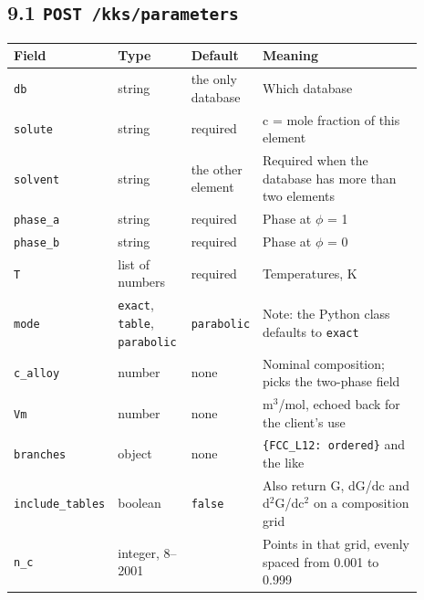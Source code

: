 \documentclass[12pt,a4paper]{article}
\begin{document}
\subsection*{9.1 \texttt{POST /\allowbreak{}kks/\allowbreak{}parameters}}
\begingroup\small
\begin{longtable}{>{\raggedright\arraybackslash}p{0.121\linewidth}>{\raggedright\arraybackslash}p{0.183\linewidth}>{\raggedright\arraybackslash}p{0.161\linewidth}>{\raggedright\arraybackslash}p{0.428\linewidth}}
\toprule
\textbf{Field} & \textbf{Type} & \textbf{Default} & \textbf{Meaning} \\
\midrule
\endhead
\texttt{db} & string & the only database & Which database \\
\texttt{solute} & string & required & c = mole fraction of this element \\
\texttt{solvent} & string & the other element & Required when the database has more than two elements \\
\texttt{phase\_\allowbreak{}a} & string & required & Phase at \(\phi\) = 1 \\
\texttt{phase\_\allowbreak{}b} & string & required & Phase at \(\phi\) = 0 \\
\texttt{T} & list of numbers & required & Temperatures, K \\
\texttt{mode} & \texttt{\textquotedbl{}exact\textquotedbl{}}, \texttt{\textquotedbl{}table\textquotedbl{}}, \texttt{\textquotedbl{}parabolic\textquotedbl{}} & \texttt{\textquotedbl{}parabolic\textquotedbl{}} & Note: the Python class defaults to \texttt{\textquotedbl{}exact\textquotedbl{}} \\
\texttt{c\_\allowbreak{}alloy} & number & none & Nominal composition; picks the two-phase field \\
\texttt{Vm} & number & none & m\(^{3}\)/mol, echoed back for the client's use \\
\texttt{branches} & object & none & \texttt{\{\textquotedbl{}FCC\_\allowbreak{}L12\textquotedbl{}: \textquotedbl{}ordered\textquotedbl{}\}} and the like \\
\texttt{include\_\allowbreak{}tables} & boolean & \texttt{false} & Also return G, dG/dc and d\(^{2}\)G/dc\(^{2}\) on a composition grid \\
\texttt{n\_\allowbreak{}c} & integer, 8--2001 & 199 & Points in that grid, evenly spaced from 0.001 to 0.999 \\
\bottomrule
\end{longtable}
\end{document}
